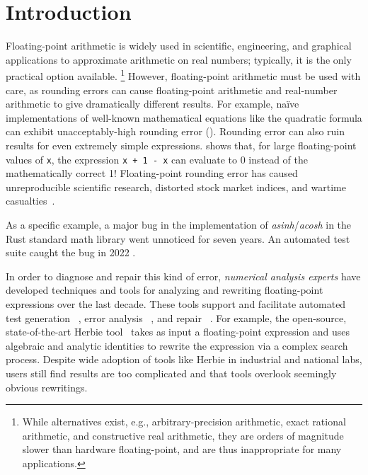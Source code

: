 \section{Introduction}

Floating-point arithmetic is widely used
  in scientific, engineering, and graphical applications
  to approximate arithmetic on real numbers;
  typically, it is the
  only practical option available.%
\footnote{
  While alternatives exist,
    e.g., arbitrary-precision arithmetic,
    exact rational arithmetic,
    and constructive real arithmetic,
    they are orders of magnitude slower
    than hardware floating-point,
    and are thus inappropriate for many applications.
}
However, floating-point arithmetic must be used with care,
  as rounding errors can cause floating-point arithmetic
  and real-number arithmetic to give dramatically different results.
For example,
  naïve implementations of
  well-known mathematical equations like the quadratic formula
  can exhibit unacceptably-high rounding error ().
Rounding error can also ruin results
  for even extremely simple expressions.
 shows that,
  for large floating-point values of \texttt{x},
  the expression \texttt{x + 1 - x} can evaluate to 0
  instead of the mathematically correct 1!
Floating-point rounding error has caused
  unreproducible scientific research,
  distorted stock market indices,
  and wartime casualties~\cite{num-replication,distort-stock,patriot,euro-rounding,wall-street-distort-stock,num-issues-in-stat,round-elections}.

As a specific example, 
  a major bug in the implementation of \textit{asinh}/\textit{acosh} 
  in the Rust standard math library went unnoticed for seven years.
An automated test suite caught the bug in 2022 \cite{herbie-rust}.

In order to diagnose and repair this kind of error,
  \textit{numerical analysis experts} have developed
  techniques and tools for analyzing and rewriting 
  floating-point expressions over the last decade.
These tools support and facilitate automated
  test generation ~\cite{s3fp},
  error analysis ~\cite{gappa,vmcai11-fluctuat,daisy,satire,fm15-fptaylor},
  and repair ~\cite{salsa,herbie}.
For example,
  the open-source, state-of-the-art Herbie tool~\cite{herbie} takes as input a floating-point expression
  and uses algebraic and analytic identities to rewrite the expression
  via a complex search process.
Despite wide adoption of tools like Herbie in
  industrial and national labs,
  users still find results are too complicated and that
  tools overlook seemingly obvious rewritings.
  
